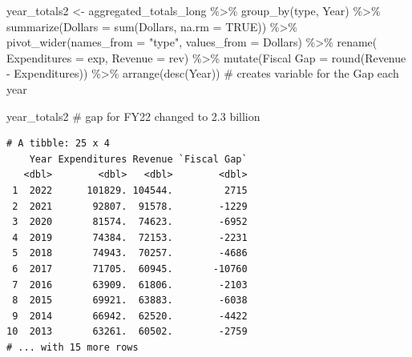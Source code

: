 \documentclass[
  letterpaper,
  DIV=11,
  numbers=noendperiod]{scrreport}
\newenvironment{Shaded}{\begin{snugshade}}{\end{snugshade}}
\newcommand{\AttributeTok}[1]{\textcolor[rgb]{0.40,0.45,0.13}{#1}}
\newcommand{\CommentTok}[1]{\textcolor[rgb]{0.37,0.37,0.37}{#1}}
\newcommand{\ConstantTok}[1]{\textcolor[rgb]{0.56,0.35,0.01}{#1}}
\newcommand{\FunctionTok}[1]{\textcolor[rgb]{0.28,0.35,0.67}{#1}}
\newcommand{\NormalTok}[1]{\textcolor[rgb]{0.00,0.23,0.31}{#1}}
\newcommand{\OtherTok}[1]{\textcolor[rgb]{0.00,0.23,0.31}{#1}}
\newcommand{\SpecialCharTok}[1]{\textcolor[rgb]{0.37,0.37,0.37}{#1}}
\newcommand{\StringTok}[1]{\textcolor[rgb]{0.13,0.47,0.30}{#1}}
\begin{document}
\begin{Shaded}
\begin{Highlighting}[]
\NormalTok{year\_totals2 }\OtherTok{\textless{}{-}}\NormalTok{ aggregated\_totals\_long }\SpecialCharTok{\%\textgreater{}\%} 
  \FunctionTok{group\_by}\NormalTok{(type, Year) }\SpecialCharTok{\%\textgreater{}\%} 
  \FunctionTok{summarize}\NormalTok{(}\AttributeTok{Dollars =} \FunctionTok{sum}\NormalTok{(Dollars, }\AttributeTok{na.rm =} \ConstantTok{TRUE}\NormalTok{)) }\SpecialCharTok{\%\textgreater{}\%} 
  \FunctionTok{pivot\_wider}\NormalTok{(}\AttributeTok{names\_from =} \StringTok{"type"}\NormalTok{, }\AttributeTok{values\_from =}\NormalTok{ Dollars) }\SpecialCharTok{\%\textgreater{}\%} 
  \FunctionTok{rename}\NormalTok{(}
         \AttributeTok{Expenditures =}\NormalTok{ exp,}
         \AttributeTok{Revenue =}\NormalTok{ rev) }\SpecialCharTok{\%\textgreater{}\%}  
  \FunctionTok{mutate}\NormalTok{(}\StringTok{\textasciigrave{}}\AttributeTok{Fiscal Gap}\StringTok{\textasciigrave{}} \OtherTok{=} \FunctionTok{round}\NormalTok{(Revenue }\SpecialCharTok{{-}}\NormalTok{ Expenditures)) }\SpecialCharTok{\%\textgreater{}\%} 
  \FunctionTok{arrange}\NormalTok{(}\FunctionTok{desc}\NormalTok{(Year))}
\CommentTok{\# creates variable for the Gap each year}

\NormalTok{year\_totals2 }\CommentTok{\# gap for FY22 changed to 2.3 billion}
\end{Highlighting}
\end{Shaded}

\begin{verbatim}
# A tibble: 25 x 4
    Year Expenditures Revenue `Fiscal Gap`
   <dbl>        <dbl>   <dbl>        <dbl>
 1  2022      101829. 104544.         2715
 2  2021       92807.  91578.        -1229
 3  2020       81574.  74623.        -6952
 4  2019       74384.  72153.        -2231
 5  2018       74943.  70257.        -4686
 6  2017       71705.  60945.       -10760
 7  2016       63909.  61806.        -2103
 8  2015       69921.  63883.        -6038
 9  2014       66942.  62520.        -4422
10  2013       63261.  60502.        -2759
# ... with 15 more rows
\end{verbatim}
\end{document}
